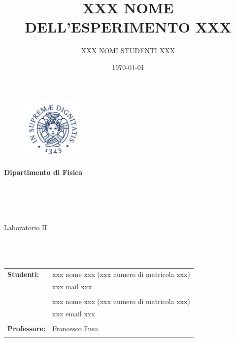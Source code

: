 \documentclass[a4paper,11pt]{article}
\title{XXX NOME DELL'ESPERIMENTO XXX}
\author{XXX NOMI STUDENTI XXX}
\date{\today}
\begin{document}
	\begin{titlepage}
		\thispagestyle{empty}
		\begin{figure}
			\includegraphics[width=31.5mm,right]{./Cherubino}
		\end{figure}
		\vspace*{-43mm}\hspace{-6mm}\textbf{\textcolor{pantone294}{\large{Dipartimento di Fisica}}}\\\\\\\\\\
		
		\vspace{30mm}
		\begin{center}
			\textcolor{pantone294}{\huge{Laboratorio II}}\\\vspace*{7mm}
			\textcolor{pantone294}{\huge{\textbf{\thetitle}}}\\\vspace*{10mm}
			\textcolor{pantone294}{\theauthor}\\\vspace*{10mm}
			\textcolor{pantone294}{\thedate}\\\vspace*{20mm}
			\begin{tabular}{ll}
				\textbf{Studenti:} & xxx nome xxx (xxx numero di matricola xxx) \\
				& xxx mail xxx\\ \\
				& xxx nome xxx (xxx numero di matricola xxx) \\
				& xxx email xxx \\ \\
				\textbf{Professore:} & Francesco Fuso \\ \\
				
			\end{tabular}
		\end{center}
	\end{titlepage}
	\makeatother
	\restoregeometry
	\newpage
	
\end{document}
